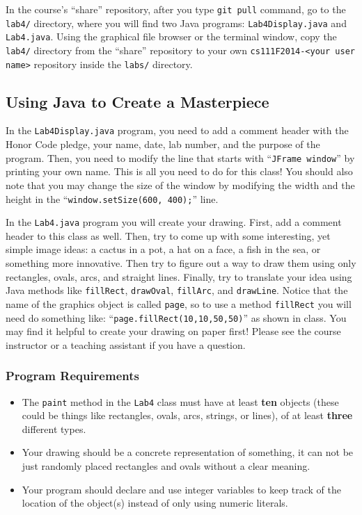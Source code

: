 In the course's ``share'' repository, after you type {\tt git pull} command, go to the {\tt lab4/} directory, where you
will find two Java programs: {\tt Lab4Display.java} and {\tt Lab4.java}. Using the graphical file browser or the
terminal window, copy the {\tt lab4/} directory from the ``share'' repository to your own {\tt cs111F2014-<your user
name>} repository inside the {\tt labs/} directory.

\subsection*{Using Java to Create a Masterpiece}

In the {\tt Lab4Display.java} program, you need to add a comment header with the Honor Code pledge, your name, date, lab
number, and the purpose of the program. Then, you need to modify the line that starts with ``{\tt JFrame window}'' by
printing your own name. This is all you need to do for this class! You should also note that you may change the size of
the window by modifying the width and the height in the ``{\tt window.setSize(600, 400);}'' line. 

In the {\tt Lab4.java} program you will create your drawing. First, add a comment header to this class as well.  Then,
try to come up with some interesting, yet simple image ideas: a cactus in a pot, a hat on a face, a fish in the sea, or
something more innovative.  Then try to figure out a way to draw them using only rectangles, ovals, arcs, and straight
lines.  Finally, try to translate your idea using Java methods like {\tt fillRect}, {\tt drawOval}, {\tt fillArc}, and
{\tt drawLine}. Notice that the name of the graphics object is called {\tt page}, so to use a method {\tt fillRect} you
will need do something like: ``{\tt page.fillRect(10,10,50,50)}'' as shown in class.  You may find it helpful to create
your drawing on paper first! Please see the course instructor or a teaching assistant if you have a question.

\subsubsection*{Program Requirements}
\begin{itemize}
\item The {\tt paint} method in the {\tt Lab4} class must have at least \textbf{ten} objects (these could be things like rectangles, ovals, arcs, strings, or lines), of at least \textbf{three} different types.
\item Your drawing should be a concrete representation of something, it can not be just randomly placed rectangles and
  ovals without a clear meaning. 
\item Your program should declare and use integer variables to keep track of
the location of the object(s) instead of only using numeric literals. 
\end{itemize}

